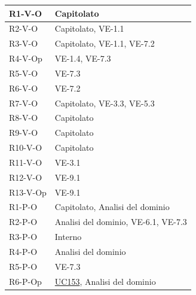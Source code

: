 \begin{longtable}{|p{2.8cm}|p{10.2cm}|}
	R1-V-O  & Capitolato \\ \hline
	R2-V-O  & Capitolato, VE-1.1 \\ \hline
	R3-V-O  & Capitolato, VE-1.1, VE-7.2 \\ \hline
	R4-V-Op & VE-1.4, VE-7.3 \\ \hline
	R5-V-O  & VE-7.3 \\ \hline
	R6-V-O  & VE-7.2 \\ \hline
	R7-V-O  & Capitolato, VE-3.3, VE-5.3 \\ \hline
	R8-V-O  & Capitolato \\ \hline
	R9-V-O  & Capitolato \\ \hline
	R10-V-O & Capitolato \\ \hline
	R11-V-O & VE-3.1 \\ \hline
	R12-V-O & VE-9.1 \\ \hline
	R13-V-Op & VE-9.1 \\ \hline

	R1-P-O  & Capitolato, Analisi del dominio \\ \hline
	R2-P-O  & Analisi del dominio, VE-6.1, VE-7.3 \\ \hline
	R3-P-O  & Interno \\ \hline
	R4-P-O  & Analisi del dominio \\ \hline
	R5-P-O  & VE-7.3 \\ \hline
	R6-P-Op & \hyperlink{uc153}{UC153}, Analisi del dominio \\ \hline

\end{longtable}

